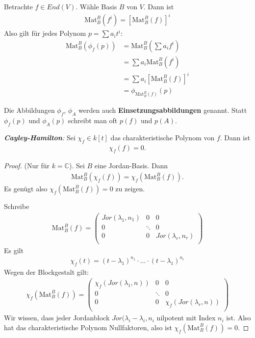 \documentclass{report}
\newcommand*{\newpar}{\par\vspace{\baselineskip}\noindent}
\newcommand{\tbf}[1]{\textbf{#1}}
\newcommand{\bC}{\mathbb{C}}
\newcommand{\Mat}[3]{\text{Mat}^{#1}_{#2}\left(#3\right)}
\begin{document}
\begin{beobachtung}
 Betrachte $f \in End(V)$. Wähle Basis $B$ von $V$. Dann ist
 \begin{align*}
  \Mat{B}{B}{f^i} = \left[\Mat{B}{B}{f}\right]^i
 \end{align*}
 Also gilt für jedes Polynom $p = \sum a_i t^i$:
 \begin{align*}
  \Mat{B}{B}{\phi_f(p)} &= \Mat{B}{B}{\sum a_i f^i}\\ 
                        &= \sum a_i \Mat{B}{B}{f^i}\\ 
                        &= \sum a_i \left[\Mat{B}{B}{f}\right]^i\\
                        &= \phi_{\Mat{B}{B}{f}}(p)
 \end{align*}
\end{beobachtung}
\begin{anmerkung}
 Die Abbildungen $\phi_f$, $\phi_A$ werden auch \tbf{Einsetzungsabbildungen} genannt. Statt $\phi_f(p)$ und $\phi_A(p)$ schreibt man oft $p(f)$ und $p(A)$.
\end{anmerkung}
\begin{theorem}
 \emph{\tbf{Cayley-Hamilton}:} Sei $\chi_f \in k[t]$ das charakteristische Polynom von $f$. Dann ist
 \begin{align*}
  \chi_f(f) = 0.
 \end{align*}
\end{theorem}
\begin{proof}
 (Nur für $k = \bC$). Sei $B$ eine Jordan-Basis. Dann 
 \begin{align*}
  \Mat{B}{B}{\chi_f(f)} = \chi_f \left(\Mat{B}{B}{f}\right).
 \end{align*}
 Es genügt also 
 $
  \chi_f \left(\Mat{B}{B}{f}\right) = 0
 $
 zu zeigen.
 \newpar
 Schreibe
 \begin{align*}
  \Mat{B}{B}{f} = \begin{pmatrix}
                   Jor(\lambda_1, n_1) & 0 & 0\\
                   0 & \ddots & 0\\
                   0 & 0 & Jor(\lambda_r, n_r)\\
                  \end{pmatrix}
 \end{align*}
 Es gilt
 \begin{align*}
  \chi_f(t) = (t - \lambda_1)^{n_1} \cdot \hdots \cdot  (t - \lambda_1)^{n_r}
 \end{align*}
 Wegen der Blockgestalt gilt:
 \begin{align*}
  \chi_f(\Mat{B}{B}{f}) = \begin{pmatrix}
                   \chi_f(Jor(\lambda_1, n)) & 0 & 0\\
                   0 & \ddots & 0\\
                   0 & 0 & \chi_f(Jor(\lambda_r, n))\\
                  \end{pmatrix}
 \end{align*}
 Wir wissen, dass jeder Jordanblock $Jor(\lambda_i - \lambda_i, n_i$ nilpotent mit Index $n_i$ ist. Also hat das charakteristische Polynom Nullfaktoren, also ist $\chi_f \left(\Mat{B}{B}{f}\right) = 0$.
\end{proof}
%
%
%
%
%
\end{document}
